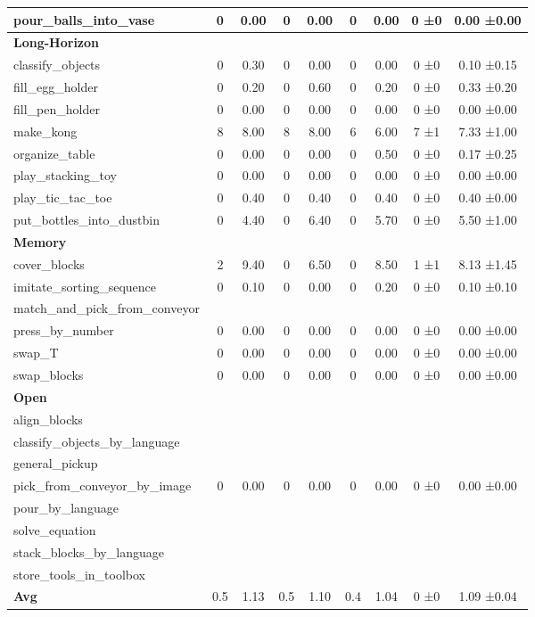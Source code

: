 \begin{table}[H]
{\begin{tabular}{l|c|c|c|c|c|c|c|c}
pour\_balls\_into\_vase & 0 & 0.00 & 0 & 0.00 & 0 & 0.00 & 0 ±0 & 0.00 ±0.00 \\
\hline
\multicolumn{9}{l}{\textbf{Long-Horizon}} \\
classify\_objects & 0 & 0.30 & 0 & 0.00 & 0 & 0.00 & 0 ±0 & 0.10 ±0.15 \\
fill\_egg\_holder & 0 & 0.20 & 0 & 0.60 & 0 & 0.20 & 0 ±0 & 0.33 ±0.20 \\
fill\_pen\_holder & 0 & 0.00 & 0 & 0.00 & 0 & 0.00 & 0 ±0 & 0.00 ±0.00 \\
make\_kong & 8 & 8.00 & 8 & 8.00 & 6 & 6.00 & 7 ±1 & 7.33 ±1.00 \\
organize\_table & 0 & 0.00 & 0 & 0.00 & 0 & 0.50 & 0 ±0 & 0.17 ±0.25 \\
play\_stacking\_toy & 0 & 0.00 & 0 & 0.00 & 0 & 0.00 & 0 ±0 & 0.00 ±0.00 \\
play\_tic\_tac\_toe & 0 & 0.40 & 0 & 0.40 & 0 & 0.40 & 0 ±0 & 0.40 ±0.00 \\
put\_bottles\_into\_dustbin & 0 & 4.40 & 0 & 6.40 & 0 & 5.70 & 0 ±0 & 5.50 ±1.00 \\
\hline
\multicolumn{9}{l}{\textbf{Memory}} \\
cover\_blocks & 2 & 9.40 & 0 & 6.50 & 0 & 8.50 & 1 ±1 & 8.13 ±1.45 \\
imitate\_sorting\_sequence & 0 & 0.10 & 0 & 0.00 & 0 & 0.20 & 0 ±0 & 0.10 ±0.10 \\
match\_and\_pick\_from\_conveyor &  &  &  &  &  &  &  &  \\
press\_by\_number & 0 & 0.00 & 0 & 0.00 & 0 & 0.00 & 0 ±0 & 0.00 ±0.00 \\
swap\_T & 0 & 0.00 & 0 & 0.00 & 0 & 0.00 & 0 ±0 & 0.00 ±0.00 \\
swap\_blocks & 0 & 0.00 & 0 & 0.00 & 0 & 0.00 & 0 ±0 & 0.00 ±0.00 \\
\hline
\multicolumn{9}{l}{\textbf{Open}} \\
align\_blocks &  &  &  &  &  &  &  &  \\
classify\_objects\_by\_language &  &  &  &  &  &  &  &  \\
general\_pickup &  &  &  &  &  &  &  &  \\
pick\_from\_conveyor\_by\_image & 0 & 0.00 & 0 & 0.00 & 0 & 0.00 & 0 ±0 & 0.00 ±0.00 \\
pour\_by\_language &  &  &  &  &  &  &  &  \\
solve\_equation &  &  &  &  &  &  &  &  \\
stack\_blocks\_by\_language &  &  &  &  &  &  &  &  \\
store\_tools\_in\_toolbox &  &  &  &  &  &  &  &  \\
\hline
\textbf{Avg} & 0.5 & 1.13 & 0.5 & 1.10 & 0.4 & 1.04 & 0 ±0 & 1.09 ±0.04 \\
\hline
\end{tabular}
}
\end{table}
